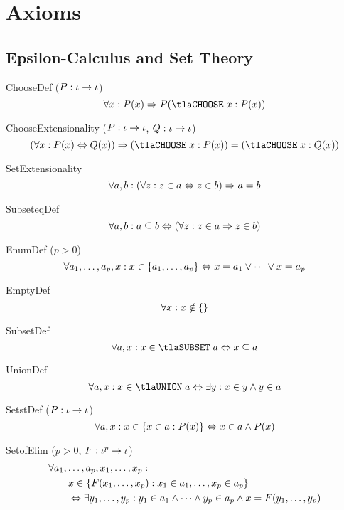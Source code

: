 \documentclass[11pt, a4paper, oneside]{article}
\begin{document}
\newpage
\section{Axioms}
\label{sec:axioms}

    \subsection{Epsilon-Calculus and Set Theory}
    \label{subsec:epsilon_and_sets}

\begin{axioms}
\item[ChooseDef ($P : \iota \rightarrow \iota$)] \[
        \forall x : P(x) \imp P(\tlaCHOOSE\; x : P(x))
    \]

\item[ChooseExtensionality ($P : \iota \rightarrow \iota$, $Q : \iota \rightarrow \iota$)] \[
        (\forall x : P(x) \eqv Q(x)) \imp (\tlaCHOOSE\; x : P(x)) = (\tlaCHOOSE\; x : Q(x))
    \]

\item[SetExtensionality] \[
        \forall a, b : (\forall z : z \in a \Leftrightarrow z \in b) \Rightarrow a = b
    \]

\item[SubseteqDef] \[
        \forall a, b : a \subseteq b \Leftrightarrow (\forall z : z \in a \Rightarrow z \in b)
    \]

\item[EnumDef ($p > 0$)] \[
        \forall a_1, \dots, a_p, x : x \in \left\{  a_1, \dots, a_p  \right\} \Leftrightarrow x = a_1 \vee \dots \vee x = a_p
    \]

\item[EmptyDef] \[
        \forall x : x \notin \left\{  \right\}
    \]

\item[SubsetDef] \[
        \forall a, x : x \in \tlaSUBSET\; a \eqv x \subseteq a
    \]

\item[UnionDef] \[
        \forall a, x : x \in \tlaUNION\; a \eqv \exists y : x \in y \wedge y \in a
    \]

\item[SetstDef ($P : \iota \rightarrow \iota$)] \[
        \forall a, x : x \in \left\{  x \in a : P(x)  \right\} \Leftrightarrow x \in a \wedge P(x)
    \]

\item[SetofElim ($p > 0$, $F : \iota^p \rightarrow \iota$)] \[
        \begin{aligned}
            &\forall a_1, \dots, a_p, x_1, \dots, x_p : \\
            &\qquad x \in \left\{  F(x_1, \dots, x_p) : x_1 \in a_1, \dots, x_p \in a_p  \right\} \\
            &\qquad \Leftrightarrow \exists y_1, \dots, y_p : y_1 \in a_1 \wedge \dots \wedge y_p \in a_p \wedge x = F(y_1, \dots, y_p)
        \end{aligned}
    \]


\end{axioms}
\end{document}
